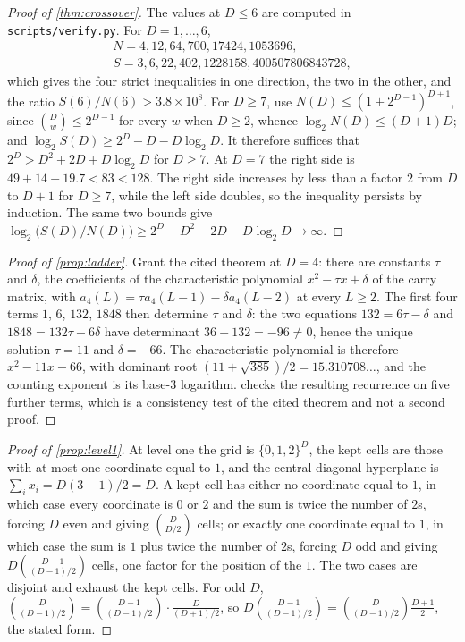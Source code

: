 \documentclass[11pt]{amsart}
\theoremstyle{definition}
\theoremstyle{remark}
\begin{document}
\begin{proof}[Proof of \cref{thm:crossover}]
The values at $D \le 6$ are computed in \texttt{scripts/\allowbreak verify.py}. For $D = 1,\dots,6$,
\begin{gather*}
  N = 4, 12, 64, 700, 17424, 1053696,\\
  S = 3, 6, 22, 402, 1228158, 400507806843728,
\end{gather*}
which gives the four strict inequalities in one direction, the two in the other, and the ratio $S(6)/N(6) > 3.8\times 10^{8}$. For $D \ge 7$, use $N(D) \le (1+2^{D-1})^{D+1}$, since $\binom{D}{w} \le 2^{D-1}$ for every $w$ when $D \ge 2$, whence $\log_{2}N(D) \le (D+1)D$; and $\log_{2}S(D) \ge 2^{D}-D-D\log_{2}D$. It therefore suffices that $2^{D} > D^{2}+2D+D\log_{2}D$ for $D \ge 7$. At $D=7$ the right side is $49+14+19.7 < 83 < 128$. The right side increases by less than a factor $2$ from $D$ to $D+1$ for $D \ge 7$, while the left side doubles, so the inequality persists by induction. The same two bounds give $\log_{2}\bigl(S(D)/N(D)\bigr) \ge 2^{D}-D^{2}-2D-D\log_{2}D \to \infty$.
\end{proof}

\begin{proof}[Proof of \cref{prop:ladder}]
Grant the cited theorem at $D = 4$: there are constants $\tau$ and $\delta$, the coefficients of the characteristic polynomial $x^{2}-\tau x+\delta$ of the carry matrix, with $a_{4}(L) = \tau a_{4}(L-1)-\delta a_{4}(L-2)$ at every $L \ge 2$. The first four terms $1$, $6$, $132$, $1848$ then determine $\tau$ and $\delta$: the two equations $132 = 6\tau-\delta$ and $1848 = 132\tau-6\delta$ have determinant $36-132 = -96 \neq 0$, hence the unique solution $\tau = 11$ and $\delta = -66$. The characteristic polynomial is therefore $x^{2}-11x-66$, with dominant root $(11+\sqrt{385})/2 = 15.310708\ldots$, and the counting exponent is its base-$3$ logarithm.  checks the resulting recurrence on five further terms, which is a consistency test of the cited theorem and not a second proof.
\end{proof}

\begin{proof}[Proof of \cref{prop:level1}]
At level one the grid is $\{0,1,2\}^{D}$, the kept cells are those with at most one coordinate equal to $1$, and the central diagonal hyperplane is $\sum_{i}x_{i} = D(3-1)/2 = D$. A kept cell has either no coordinate equal to $1$, in which case every coordinate is $0$ or $2$ and the sum is twice the number of $2$s, forcing $D$ even and giving $\binom{D}{D/2}$ cells; or exactly one coordinate equal to $1$, in which case the sum is $1$ plus twice the number of $2$s, forcing $D$ odd and giving $D\binom{D-1}{(D-1)/2}$ cells, one factor for the position of the $1$. The two cases are disjoint and exhaust the kept cells. For odd $D$, $\binom{D}{(D-1)/2} = \binom{D-1}{(D-1)/2}\cdot\frac{D}{(D+1)/2}$, so $D\binom{D-1}{(D-1)/2} = \binom{D}{(D-1)/2}\frac{D+1}{2}$, the stated form.
\end{proof}
\end{document}

